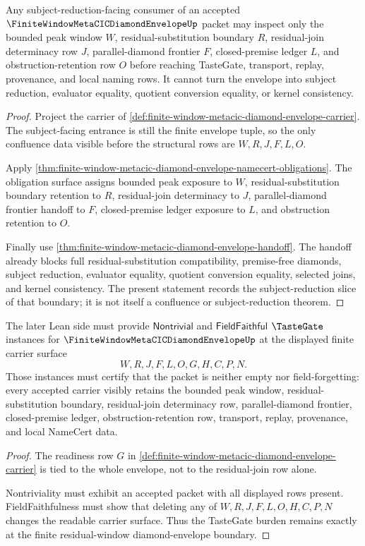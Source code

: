 \begin{theorem}
\label{thm:finite-window-metacic-diamond-envelope-subject-slice}
Any subject-reduction-facing consumer of an accepted $\FiniteWindowMetaCICDiamondEnvelopeUp$ packet may inspect only the bounded peak window $W$, residual-substitution boundary $R$, residual-join determinacy row $J$, parallel-diamond frontier $F$, closed-premise ledger $L$, and obstruction-retention row $O$ before reaching TasteGate, transport, replay, provenance, and local naming rows. It cannot turn the envelope into subject reduction, evaluator equality, quotient conversion equality, or kernel consistency.
\end{theorem}
\begin{proof}
Project the carrier of \autoref{def:finite-window-metacic-diamond-envelope-carrier}. The subject-facing entrance is still the finite envelope tuple, so the only confluence data visible before the structural rows are $W,R,J,F,L,O$.

Apply \autoref{thm:finite-window-metacic-diamond-envelope-namecert-obligations}. The obligation surface assigns bounded peak exposure to $W$, residual-substitution boundary retention to $R$, residual-join determinacy to $J$, parallel-diamond frontier handoff to $F$, closed-premise ledger exposure to $L$, and obstruction retention to $O$.

Finally use \autoref{thm:finite-window-metacic-diamond-envelope-handoff}. The handoff already blocks full residual-substitution compatibility, premise-free diamonds, subject reduction, evaluator equality, quotient conversion equality, selected joins, and kernel consistency. The present statement records the subject-reduction slice of that boundary; it is not itself a confluence or subject-reduction theorem.
\end{proof}

\begin{theorem}
\label{thm:finite-window-metacic-diamond-envelope-tastegate-scope}
The later Lean side must provide $\mathsf{Nontrivial}$ and $\mathsf{FieldFaithful}$ $\TasteGate$ instances for $\FiniteWindowMetaCICDiamondEnvelopeUp$ at the displayed finite carrier surface
$$
W,R,J,F,L,O,G,H,C,P,N .
$$
Those instances must certify that the packet is neither empty nor field-forgetting: every accepted carrier visibly retains the bounded peak window, residual-substitution boundary, residual-join determinacy row, parallel-diamond frontier, closed-premise ledger, obstruction-retention row, transport, replay, provenance, and local NameCert data.
\end{theorem}
\begin{proof}
The readiness row $G$ in \autoref{def:finite-window-metacic-diamond-envelope-carrier} is tied to the whole envelope, not to the residual-join row alone.

Nontriviality must exhibit an accepted packet with all displayed rows present. FieldFaithfulness must show that deleting any of $W,R,J,F,L,O,H,C,P,N$ changes the readable carrier surface. Thus the TasteGate burden remains exactly at the finite residual-window diamond-envelope boundary.
\end{proof}

